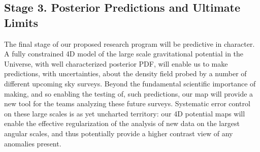 \documentclass[psfig,12pt]{article}
\def\ni{\noindent}
\def\lo{\mathrel{\raise.3ex\hbox{$<$}\mkern-14mu\lower0.6ex\hbox{$\sim$}}}
\begin{document}
{%
%
%
%


\subsection{Stage 3. Posterior Predictions and Ultimate Limits}
\label{sec:research:stagethree}

The final stage of our proposed research program will be predictive in
character. A fully constrained 4D model of the large scale gravitational
potential in the Universe, with well characterized posterior PDF, will
enable us to make predictions, with uncertainties, about the  density
field probed by a number of different upcoming sky surveys. Beyond the
fundamental scientific importance of making, and so enabling the testing
of, such predictions, our map will provide a new tool for the
teams analyzing these future surveys. Systematic error control on these
large scales is as yet uncharted territory: our 4D potential maps will
enable the effective regularization of the analysis of
new data on the largest angular scales, and thus potentially provide a
higher contrast view of any anomalies present.

}
\end{document}
